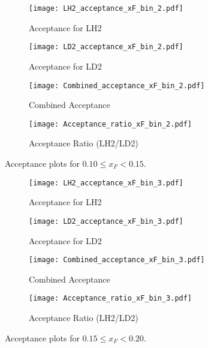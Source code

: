 \documentclass{article}
\begin{document}
\begin{figure}[H]
    \centering
    \begin{subfigure}[b]{0.48\textwidth}
       \texttt{[image: LH2\_acceptance\_xF\_bin\_2.pdf]}
       \caption{Acceptance for LH2}
    \end{subfigure}
    \hfill
    \begin{subfigure}[b]{0.48\textwidth}
       \texttt{[image: LD2\_acceptance\_xF\_bin\_2.pdf]}
       \caption{Acceptance for LD2}
    \end{subfigure}

    \begin{subfigure}[b]{0.48\textwidth}
       \texttt{[image: Combined\_acceptance\_xF\_bin\_2.pdf]}
       \caption{Combined Acceptance}
    \end{subfigure}
    \hfill
    \begin{subfigure}[b]{0.48\textwidth}
       \texttt{[image: Acceptance\_ratio\_xF\_bin\_2.pdf]}
       \caption{Acceptance Ratio (LH2/LD2)}
    \end{subfigure}
    \caption{Acceptance plots for $0.10 \le x_F < 0.15$.}
\end{figure}

\begin{figure}[H]
    \centering
    \begin{subfigure}[b]{0.48\textwidth}
       \texttt{[image: LH2\_acceptance\_xF\_bin\_3.pdf]}
       \caption{Acceptance for LH2}
    \end{subfigure}
    \hfill
    \begin{subfigure}[b]{0.48\textwidth}
       \texttt{[image: LD2\_acceptance\_xF\_bin\_3.pdf]}
       \caption{Acceptance for LD2}
    \end{subfigure}

    \begin{subfigure}[b]{0.48\textwidth}
       \texttt{[image: Combined\_acceptance\_xF\_bin\_3.pdf]}
       \caption{Combined Acceptance}
    \end{subfigure}
    \hfill
    \begin{subfigure}[b]{0.48\textwidth}
       \texttt{[image: Acceptance\_ratio\_xF\_bin\_3.pdf]}
       \caption{Acceptance Ratio (LH2/LD2)}
    \end{subfigure}
    \caption{Acceptance plots for $0.15 \le x_F < 0.20$.}
\end{figure}
\end{document}
